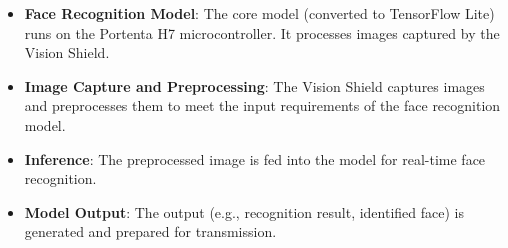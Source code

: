 \begin{itemize}
	\item \textbf{Face Recognition Model}: The core model (converted to TensorFlow Lite) runs on the Portenta H7 microcontroller. It processes images captured by the Vision Shield.
	\item \textbf{Image Capture and Preprocessing}: The Vision Shield captures images and preprocesses them to meet the input requirements of the face recognition model.
	\item \textbf{Inference}: The preprocessed image is fed into the model for real-time face recognition.
	\item \textbf{Model Output}: The output (e.g., recognition result, identified face) is generated and prepared for transmission.
\end{itemize}

